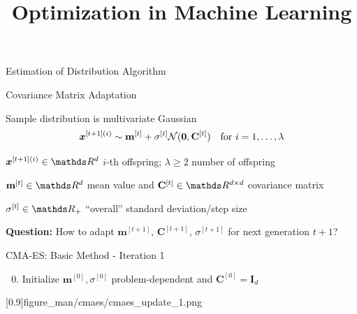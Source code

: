 \documentclass[11pt,compress,t,notes=noshow, xcolor=table]{beamer}
\title{Optimization in Machine Learning}
\begin{document}

\begin{framev}[align=top]{Estimation of Distribution Algorithm}
\end{framev}


\begin{framei}[fs=footnotesize]{Covariance Matrix Adaptation}
\item Sample distribution is multivariate Gaussian
$$
\bm{x}^{[t+1](i)} \sim \mathbf{m}^{[t]} + \sigma^{[t]} \mathcal{N}(\bm{0}, \mathbf{C}^{[t]}) \quad \text{for } i = 1, \dots, \lambda
$$
\item $\xv^{[t+1](i)} \in \R^d$ $i$-th offspring; $\lambda \geq 2$ number of offspring
\item $\mathbf{m}^{[t]} \in \R^d$ mean value and $\mathbf{C}^{[t]} \in \R^{d \times d}$ covariance matrix
\item $\sigma^{[t]} \in \R_+$ ``overall'' standard deviation/step size
\item \textbf{Question:} How to adapt $\mathbf{m}^{[t+1]}$, $\mathbf{C}^{[t+1]}$, $\sigma^{[t+1]}$ for next generation $t+1$?
\end{framei}


\begin{framev}[align=top, fs=small]{CMA-ES: Basic Method - Iteration 1}
\begin{enumerate} \setcounter{enumi}{-1}
\item Initialize $\mathbf{m}^{[0]},\sigma^{[0]}$ problem-dependent and $\mathbf{C}^{[0]}=\mathbf{I}_{d}$
\end{enumerate}
\imageFixed{2cm}{3.6cm}[0.9]{figure_man/cmaes/cmaes_update_1.png}
\end{framev}
\end{document}
